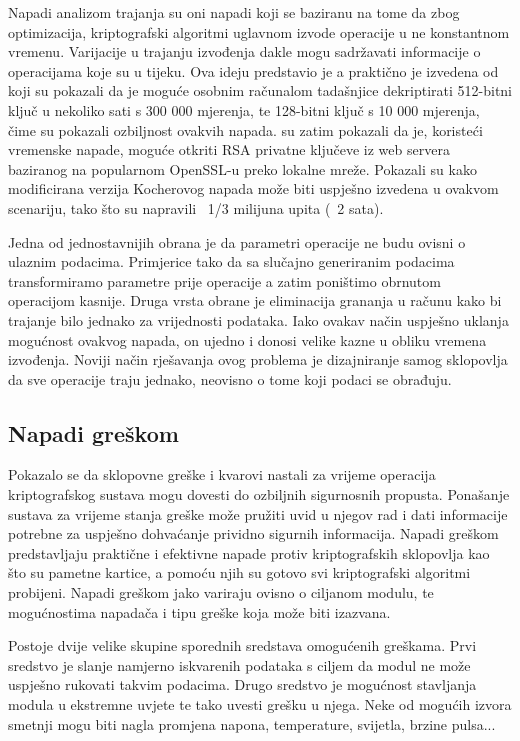 \documentclass[times, utf8, diplomski]{fer}
\begin{document}
Napadi analizom trajanja  su oni napadi koji se baziranu na tome da zbog optimizacija, kriptografski algoritmi uglavnom izvode operacije u ne konstantnom vremenu. Varijacije u trajanju izvođenja dakle mogu sadržavati informacije o operacijama koje su u tijeku. Ova ideju predstavio je \cite{kocher1996timing} a praktično je izvedena od \cite{dhem1998practical} koji su pokazali da je moguće osobnim računalom tadašnjice dekriptirati 512-bitni ključ u nekoliko sati s 300 000 mjerenja, te 128-bitni ključ s 10 000 mjerenja, čime su pokazali ozbiljnost ovakvih napada. \cite{brumley2005remote} su zatim pokazali da je, koristeći vremenske napade, moguće otkriti RSA privatne ključeve iz web servera baziranog na popularnom OpenSSL-u preko lokalne mreže. Pokazali su kako modificirana verzija Kocherovog napada može biti uspješno izvedena u ovakvom scenariju, tako što su napravili ~1/3 milijuna upita (~2 sata).

Jedna od jednostavnijih obrana je da parametri operacije ne budu ovisni o ulaznim podacima. Primjerice tako da sa slučajno generiranim podacima transformiramo parametre prije operacije a zatim poništimo obrnutom operacijom kasnije. Druga vrsta obrane je eliminacija grananja u računu kako bi trajanje bilo jednako za vrijednosti podataka. Iako ovakav način uspješno uklanja mogućnost ovakvog napada, on ujedno i donosi velike kazne u obliku vremena izvođenja. Noviji način rješavanja ovog problema je dizajniranje samog sklopovlja da sve operacije traju jednako, neovisno o tome koji podaci se obrađuju.


\subsection{Napadi greškom}

Pokazalo se da sklopovne greške i kvarovi nastali za vrijeme operacija kriptografskog sustava mogu dovesti do ozbiljnih sigurnosnih propusta. Ponašanje sustava za vrijeme stanja greške može pružiti uvid u njegov rad i dati informacije potrebne za uspješno dohvaćanje prividno sigurnih informacija. Napadi greškom  predstavljaju praktične i efektivne napade protiv kriptografskih sklopovlja kao što su pametne kartice, a pomoću njih su gotovo svi kriptografski algoritmi probijeni. Napadi greškom jako variraju ovisno o ciljanom modulu, te mogućnostima napadača i tipu greške koja može biti izazvana.

Postoje dvije velike skupine sporednih sredstava omogućenih greškama. Prvi sredstvo je slanje namjerno iskvarenih podataka s ciljem da modul ne može uspješno rukovati takvim podacima. Drugo sredstvo je mogućnost stavljanja modula u ekstremne uvjete te tako uvesti grešku u njega. Neke od mogućih izvora smetnji mogu biti nagla promjena napona, temperature, svijetla, brzine pulsa...
\end{document}
